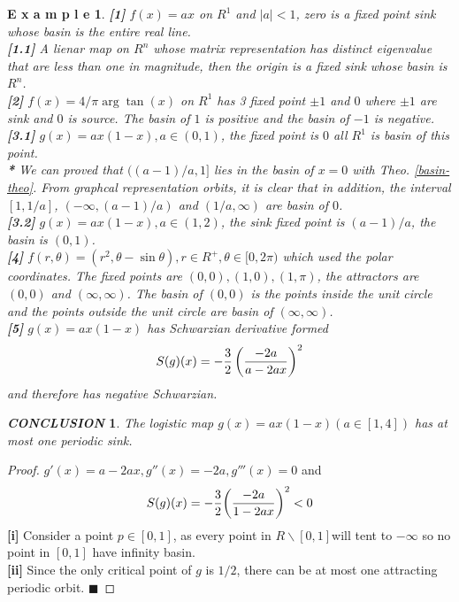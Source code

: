 \documentclass[12pt]{article}
\theoremstyle{plain}
\newtheorem{proof}{\textit{PROOF}}[section]
\newtheorem{example}{\textbf{E x a m p l e}}[section]
\newtheorem{conclusion}{\textit{\textbf{CONCLUSION}}}[section]
\begin{document}
\begin{example}\textbf{[1]} $f(x) = ax$ on $R^1$ and $|a| < 1$, zero is a fixed point sink whose basin is the entire real line.
\\\noindent \textbf{[1.1]} A lienar map on $R^n$ whose matrix representation has distinct eigenvalue that are less than one in magnitude, then the origin is a fixed sink whose basin is $R^n$.
\\\noindent \textbf{[2]} $f(x) = {4 / \pi} \arg\tan(x)$ on $R^1$ has 3 fixed point $\pm 1$ and 
$0$ where $\pm 1$ are sink and $0$ is source. The basin of $1$ is positive and the basin of $-1$ is negative.
\\\noindent \textbf{[3.1]} $g(x) = ax(1 - x), a \in (0, 1)$, the fixed point is $0$ all $R^1$ is basin of this point.
\\\noindent \textbf{*} We can proved that $((a-1)/a, 1]$ lies in the basin of $x = 0$ with Theo. \ref {basin-theo}. From graphcal representation orbits, it is clear that in addition, the interval $[1, 1/a]$, $(-\infty, (a - 1)/a)$ and $(1/a, \infty)$ are basin of $0$.
\\\noindent \textbf{[3.2]} $g(x) = ax(1-x), a \in (1, 2)$, the sink fixed point is $(a-1 )/a$, the basin is $(0, 1)$.
\\\noindent \textbf{[4]} $f(r, \theta) = (r^2, \theta - \sin \theta), r \in R^+, \theta \in [0, 2\pi)$ which used the polar coordinates. The fixed points are $(0, 0), (1, 0), (1, \pi)$, the attractors are $(0, 0)$ and $(\infty, \infty)$. The basin of $(0, 0)$ is the points inside the unit circle and the points outside the unit circle are basin of $(\infty, \infty)$.
\\\noindent \textbf{[5]} $g(x) = ax (1-x)$ has Schwarzian derivative formed 
$$
S(g)(x) = -{3 \over 2}\left({-2a \over a - 2ax}\right)^2
$$
and therefore has negative Schwarzian.
\end{example}


\begin{conclusion} The logistic map $g(x) = ax(1-x) (a \in [1, 4])$ has at most one periodic sink.
\end{conclusion}

{\color{blue}
\begin{proof} $g'(x) = a - 2ax, g''(x) = -2a, g'''(x) = 0$ and 
$$
S(g)(x) = -{3\over 2}{\left(-2a \over 1-2ax\right)^2} < 0
$$
            \textbf{[i]} Consider a point $p \in [0, 1]$, as every point in $R\backslash [0, 1]$will tent to $-\infty$ so no point in $[0, 1]$ have infinity basin.
\\\noindent \textbf{[ii]} Since the only critical point of $g$ is $1/2$, there can be at most one attracting periodic orbit. $\blacksquare$
\end{proof}
}
\end{document}
